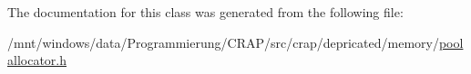The documentation for this class was generated from the following file\-:\begin{DoxyCompactItemize}
\item 
/mnt/windows/data/\-Programmierung/\-C\-R\-A\-P/src/crap/depricated/memory/\hyperlink{poolallocator_8h}{poolallocator.\-h}\end{DoxyCompactItemize}
